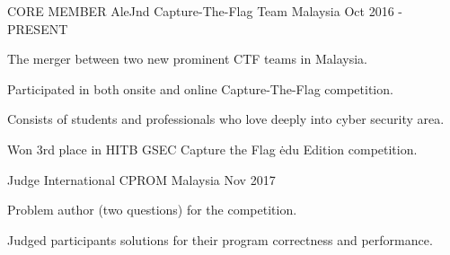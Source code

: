 

\begin{cventries}

    \cventry
    {CORE MEMBER}
    {AleJnd Capture-The-Flag Team}
    {Malaysia}
    {Oct 2016 - PRESENT}
    {
      \begin{cvitems}
        \item {The merger between two new prominent CTF teams in Malaysia.}
        \item {Participated in both onsite and online Capture-The-Flag competition.}
        \item {Consists of students and professionals who love deeply into cyber security area.}
        \item {Won 3rd place in HITB GSEC Capture the Flag \.edu Edition competition.}
      \end{cvitems}
    }

    \cventry
    {Judge}
    {International CPROM}
    {Malaysia}
    {Nov 2017}
    {
      \begin{cvitems}
        \item {Problem author (two questions) for the competition.}
        \item {Judged participants solutions for their program correctness and performance.}
      \end{cvitems}
    }
\end{cventries}
